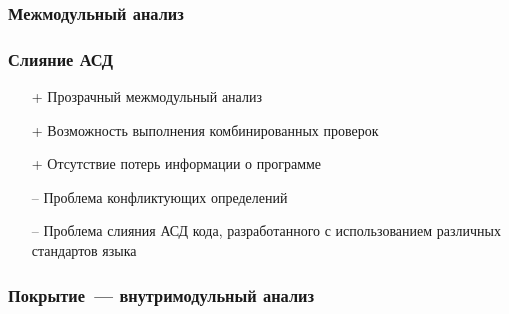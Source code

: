 \documentclass[hyperref={pdfpagelabels=false}]{beamer}
\begin{document}
\begin{frame}
\frametitle{Межмодульный анализ}
\begin{figure}[h]
\end{figure}
\end{frame}


\begin{frame}
\frametitle{Слияние АСД}
\begin{itemize}
 \item[+] Прозрачный межмодульный анализ
 \item[+] Возможность выполнения комбинированных проверок
 \item[+] Отсутствие потерь информации о программе
 \item[--] Проблема конфликтующих определений
 \item[--] Проблема слияния АСД кода, разработанного с использованием различных стандартов языка
\end{itemize}
\end{frame}


\begin{frame}
\frametitle{Покрытие~--- внутримодульный анализ}
\begin{figure}[h]
\end{figure}
\end{frame}
\end{document}
